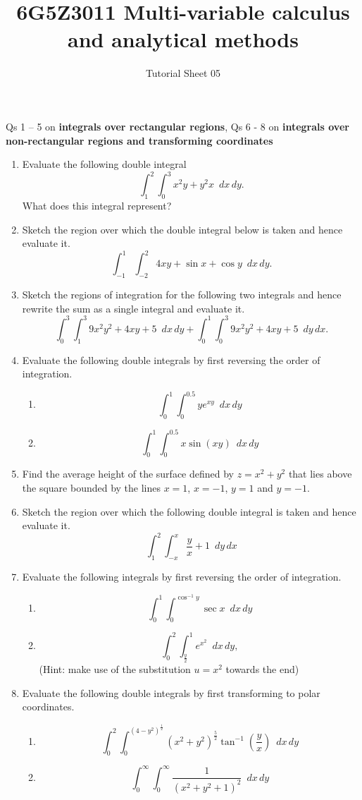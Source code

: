 \documentclass[a4paper]{amsart}
\begin{document}
\title{6G5Z3011 Multi-variable calculus and analytical methods}
\author{Tutorial Sheet 05}
\maketitle

Qs 1 -- 5 on \textbf{integrals over rectangular regions}, Qs 6 - 8 on \textbf{integrals over non-rectangular regions and transforming coordinates}
\begin{enumerate}
    \item
Evaluate the following double integral
$$\int_1^2  \int_0^3 x^2y + y^2 x \, \,\,  dx \, dy .$$
What does this integral represent?
\item
Sketch the region over which the double integral below is taken and hence evaluate it.
$$\int_{-1}^1 \int_{-2}^2 4xy + \sin x + \cos y \,\,\,  dx \, dy.$$
\item
Sketch the regions of integration for the following two integrals and hence rewrite the sum as a single integral and evaluate it.
$$ \int_0^3 \int_1^3 9x^2 y^2 + 4xy + 5 \, \, \, dx \, dy +
\int_0^1 \int_0^3 9x^2 y^2 + 4xy + 5 \, \, \, dy \, dx .$$
\item
Evaluate the following double integrals by first reversing the order of integration.
\begin{enumerate}
\item
$$ \int_0^1 \int_0^{0.5} y e^{xy} \, \, \, dx \, dy $$
\item
$$\int_0^1 \int_0^{0.5} x \sin(xy) \, \, \, dx \, dy $$
\end{enumerate}
\item
Find the average height of the surface defined by $z=x^2 + y^2$ that lies above the square bounded by the lines $x=1$, $x=-1$, $y=1$ and $y=-1$.


\item
Sketch the region over which the following double integral is taken and hence evaluate it.
$$ \int_1^2 \int_{-x}^x \frac{y}{x} + 1 \, \, \, dy \, dx $$
\item
Evaluate the following integrals by first reversing the order of integration.
\begin{enumerate}
\item
$$\int_0^1 \int_0^{\cos^{-1} y} \sec x \, \, \, dx \, dy $$
\item
$$ \int_0^2 \int_{\frac{y}{2}}^1 e^{x^2} \, \, \, dx \, dy,$$
(Hint: make use of the substitution $u=x^2$ towards the end)
\end{enumerate}
\newpage
\item
Evaluate the following double integrals by first transforming to polar coordinates.
\begin{enumerate}
\item
$$\int_0^2 \int_0^{\left ( 4 - y^2 \right )^{\frac{1}{2}}} \left ( x^2 + y^2 \right )^{\frac{5}{2}} \tan^{-1} \left ( \frac{y}{x} \right ) \, \, \, dx \, dy $$

\item
$$\int_0^\infty \int_0^\infty \frac{1}{\left ( x^2 + y^2 + 1 \right )^2} \, \, \, dx \, dy $$
\end{enumerate}
    \end{enumerate}
\end{document}
